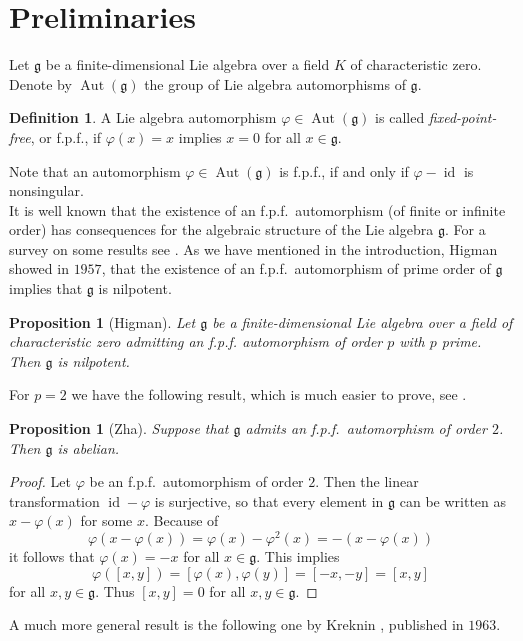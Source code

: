 \documentclass[12pt]{amsart}
\newtheorem{prop}[thm]{Proposition}
\theoremstyle{definition}
\newtheorem{defi}[thm]{Definition}
\theoremstyle{remark}
\DeclareMathOperator{\id}{id}
\DeclareMathOperator{\Aut}{Aut}
\newcommand{\Lg}{\mathfrak{g}}
\renewcommand{\phi}{\varphi}
\begin{document}
\section{Preliminaries}

Let $\Lg$ be a finite-dimensional Lie algebra over a field $K$ of characteristic zero.
Denote by $\Aut(\Lg)$ the group of Lie algebra automorphisms of $\Lg$.

\begin{defi}
A Lie algebra automorphism $\phi\in \Aut(\Lg)$ is called {\em fixed-point-free}, or f.p.f.,
if $\phi(x)=x$ implies $x=0$ for all $x\in \Lg$.
\end{defi}

Note that an automorphism $\phi\in \Aut(\Lg)$ is f.p.f., if and only if $\phi-\id$ is 
nonsingular. \\[0.2cm]
It is well known that the existence of an f.p.f.\ automorphism (of finite or infinite order) has
consequences for the algebraic structure of the Lie algebra $\Lg$. For a survey on some results see  
\cite{ZHA}. As we have mentioned in the introduction, Higman \cite{HIG} showed in $1957$, that the 
existence of an f.p.f.\ automorphism of prime order of $\Lg$ implies that $\Lg$ is nilpotent.

\begin{prop}[Higman]
Let $\Lg$ be a finite-dimensional Lie algebra over a field of characteristic zero admitting
an f.p.f. automorphism of order $p$ with $p$ prime. Then $\Lg$ is nilpotent.
\end{prop}

For $p=2$ we have the following result, which is much easier to prove, see \cite{ZHA}. 

\begin{prop}[Zha]\label{2.3}
Suppose that $\Lg$ admits an f.p.f.\ automorphism of order $2$. Then $\Lg$ is abelian.
\end{prop}

\begin{proof}
Let $\phi$ be an f.p.f.\ automorphism of order $2$. Then the linear transformation 
$\id-\phi$ is surjective, so that every element in $\Lg$ can be written as 
$x-\phi(x)$ for some $x$. Because of
\[
\phi(x-\phi(x))=\phi(x)-\phi^2(x)=-(x-\phi(x))
\]
it follows that $\phi(x)=-x$ for all $x\in \Lg$. This implies
\[
\phi([x,y])=[\phi(x),\phi(y)]=[-x,-y]=[x,y]
\]
for all $x,y\in \Lg$. Thus $[x,y]=0$ for all $x,y\in \Lg$.
\end{proof}

A much more general result is the following one by Kreknin \cite{KRE}, published in $1963$.
\end{document}
